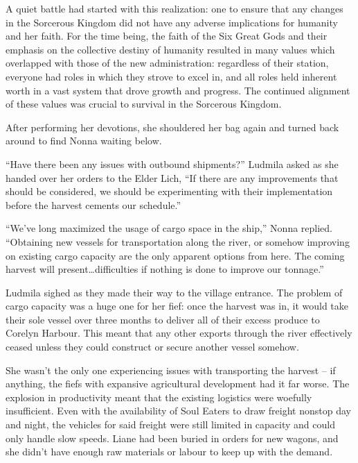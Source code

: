 A quiet battle had started with this realization: one to ensure that any changes in the Sorcerous Kingdom did not have any adverse implications for humanity and her faith. For the time being, the faith of the Six Great Gods and their emphasis on the collective destiny of humanity resulted in many values which overlapped with those of the new administration: regardless of their station, everyone had roles in which they strove to excel in, and all roles held inherent worth in a vast system that drove growth and progress. The continued alignment of these values was crucial to survival in the Sorcerous Kingdom.

 

After performing her devotions, she shouldered her bag again and turned back around to find Nonna waiting below.

 

“Have there been any issues with outbound shipments?” Ludmila asked as she handed over her orders to the Elder Lich, “If there are any improvements that should be considered, we should be experimenting with their implementation before the harvest cements our schedule.”

 

“We’ve long maximized the usage of cargo space in the ship,” Nonna replied. “Obtaining new vessels for transportation along the river, or somehow improving on existing cargo capacity are the only apparent options from here. The coming harvest will present…difficulties if nothing is done to improve our tonnage.”

 

Ludmila sighed as they made their way to the village entrance. The problem of cargo capacity was a huge one for her fief: once the harvest was in, it would take their sole vessel over three months to deliver all of their excess produce to Corelyn Harbour. This meant that any other exports through the river effectively ceased unless they could construct or secure another vessel somehow.

 

She wasn’t the only one experiencing issues with transporting the harvest – if anything, the fiefs with expansive agricultural development had it far worse. The explosion in productivity meant that the existing logistics were woefully insufficient. Even with the availability of Soul Eaters to draw freight nonstop day and night, the vehicles for said freight were still limited in capacity and could only handle slow speeds. Liane had been buried in orders for new wagons, and she didn’t have enough raw materials or labour to keep up with the demand.

